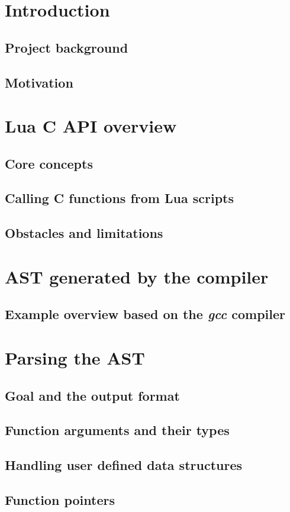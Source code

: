\documentclass[polish, english]{iithesis}
\author{Mateusz Łuczyński}
\date{\today}
\begin{document}
\chapter{Introduction}
  \section{Project background}
  \section{Motivation}
\chapter{Lua C API overview}
  \section{Core concepts}
  \section{Calling C functions from Lua scripts}
  \section{Obstacles and limitations}
\chapter{AST generated by the compiler}
  \section{Example overview based on the \textit{gcc} compiler}
\chapter{Parsing the AST}
  \section{Goal and the output format}
  \section{Function arguments and their types}
  \section{Handling user defined data structures}
  \section{Function pointers}
\end{document}
